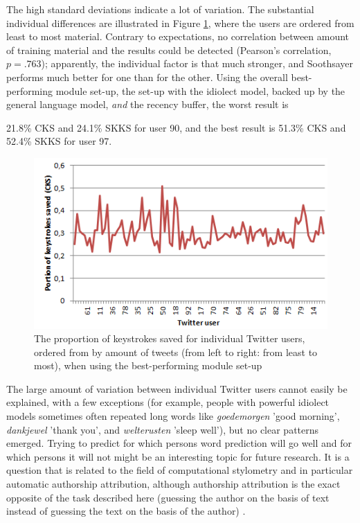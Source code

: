 \documentclass[11pt]{article}
\begin{document}
The high standard deviations indicate a lot of variation. The substantial individual differences are illustrated in Figure \ref{chaos}, where the users are ordered from least to most material. Contrary to expectations, no correlation between amount of training material and the results could be detected (Pearson's correlation, $p = .763$); apparently, the individual factor is that much stronger, and Soothsayer performs much better for one than for the other. Using the overall best-performing module set-up, the set-up with the idiolect model, backed up by the general language model, \emph{and} the recency buffer, the worst result is {21.8\% CKS and 24.1\% SKKS for user 90, and the best result is 51.3\% CKS and 52.4\% SKKS for user 97.

\begin{figure}[htb] \centering
\includegraphics[scale=0.6]{twitter_chaos}
\caption{The proportion of keystrokes saved for individual Twitter users, ordered from by amount of tweets (from left to right: from least to most), when using the best-performing module set-up}
\label{chaos}
\end{figure} 


The large amount of variation between individual Twitter users cannot easily be explained, with a few exceptions (for example, people with powerful idiolect models sometimes often repeated long words like \emph{goedemorgen} 'good morning', \emph{dankjewel} 'thank you', and \emph{welterusten} 'sleep well'), but no clear patterns emerged. Trying to predict for which persons word prediction will go well and for which persons it will not might be an interesting topic for future research. It is a question that is related to the field of computational stylometry and in particular automatic authorship attribution, although authorship attribution is the exact opposite of the task described here (guessing the author on the basis of text instead of guessing the text on the basis of the author) \cite{bagavandas+08}.

}
\end{document}
